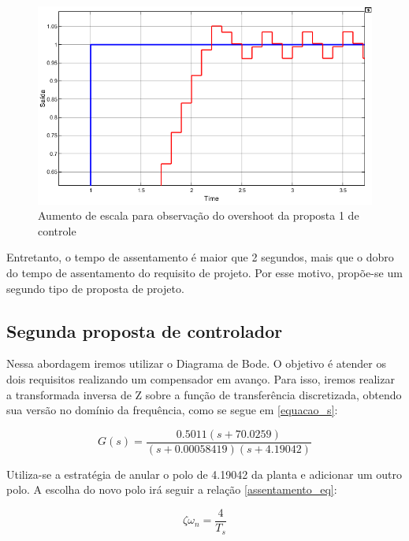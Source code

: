 \documentclass[a4paper,11pt]{article}
\begin{document}
\begin{figure}[H]
    \centering
    \includegraphics[width=\linewidth]{src/tex/img/saida_controle1_up.PNG}
    \caption{Aumento de escala para observação do overshoot da proposta 1 de controle}
    \label{fig:saidactrl1up}
\end{figure}

 Entretanto, o tempo de assentamento é maior que 2 segundos, mais que o dobro do tempo de assentamento do requisito de projeto. Por esse motivo, propõe-se um segundo tipo de proposta de projeto. 

\subsection{Segunda proposta de controlador}

Nessa abordagem iremos utilizar o Diagrama de Bode. O objetivo é atender os dois requisitos realizando um compensador em avanço. Para isso, iremos realizar a transformada inversa de Z sobre a função de transferência discretizada, obtendo sua versão no domínio da frequência, como se segue em \ref{equacao_s}:

\begin{equation}
G(s) = \frac{0.5011(s+70.0259)}{(s+0.00058419)(s+4.19042)}
\label{equacao_s}
\end{equation}

Utiliza-se a estratégia de anular o polo de 4.19042 da planta e adicionar um outro polo. A escolha do novo polo irá seguir a relação \ref{assentamento_eq}:

\begin{equation}
\zeta \omega_{n}=\frac{4}{T_{s}}
\label{assentamento_eq}
\end{equation}
\end{document}
